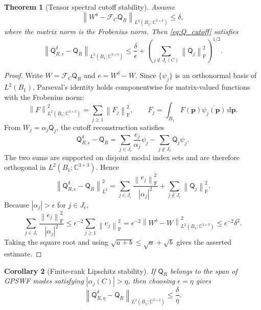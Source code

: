 \documentclass[11pt]{article}
\numberwithin{equation}{section}
\newcommand{\C}{\mathbb{C}}
\newcommand{\dd}{\,\mathrm d}
\newcommand{\vect}[1]{\bm{#1}}
\newcommand{\tens}[1]{\bm{\mathsf{#1}}}
\newcommand{\F}{\mathcal{F}}
\newcommand{\Qt}{\ensuremath{\tens{Q}}}
\newcommand{\abs}[1]{\left\lvert #1\right\rvert}
\newcommand{\norm}[1]{\left\lVert #1\right\rVert}
\newcommand{\Frob}{\mathrm F}
\theoremstyle{plain}
\newtheorem{theorem}{Theorem}[section]
\newtheorem{corollary}[theorem]{Corollary}
\theoremstyle{definition}
\begin{document}
\begin{theorem}[Tensor spectral cutoff stability]\label{thm:tensor_stability}
Assume
\begin{equation}\label{eq:data_noise_tensor}
  \norm{W^\delta-\F_C\Qt_R}_{L^2(B_1;\C^{3\times3})}\le\delta,
\end{equation}
where the matrix norm is the Frobenius norm.  Then \eqref{eq:Q_cutoff} satisfies
\begin{equation}\label{eq:tensor_cutoff_error}
  \norm{\Qt_{R,\epsilon}^\delta-\Qt_R}_{L^2(B_1;\C^{3\times3})}
  \le \frac{\delta}{\epsilon}
  +\left(\sum_{j\notin J_\epsilon(C)}\norm{\tens{Q}_j}_{\Frob}^2\right)^{1/2}.
\end{equation}
\end{theorem}

\begin{proof}
Write \(W=\F_C\Qt_R\) and \(e=W^\delta-W\).  Since \(\{\psi_j\}\) is an orthonormal basis of \(L^2(B_1)\), Parseval's identity holds componentwise for matrix-valued functions with the Frobenius norm:
\[
  \norm{F}_{L^2(B_1;\C^{3\times3})}^2
  =\sum_{j\ge1}\norm{F_j}_{\Frob}^2,
  \qquad
  F_j=\int_{B_1}F(\vect{p})\overline{\psi_j(\vect{p})}\dd\vect{p} .
\]
From \(W_j=\alpha_j\tens{Q}_j\), the cutoff reconstruction satisfies
\[
  \Qt_{R,\epsilon}^\delta-\Qt_R
  =\sum_{j\in J_\epsilon}\frac{e_j}{\alpha_j}\psi_j
  -\sum_{j\notin J_\epsilon}\tens{Q}_j\psi_j .
\]
The two sums are supported on disjoint modal index sets and are therefore orthogonal in \(L^2(B_1;\C^{3\times3})\).  Hence
\[
  \norm{\Qt_{R,\epsilon}^\delta-\Qt_R}_{L^2}^2
  =\sum_{j\in J_\epsilon}\frac{\norm{e_j}_{\Frob}^2}{\abs{\alpha_j}^2}
  +\sum_{j\notin J_\epsilon}\norm{\tens{Q}_j}_{\Frob}^2 .
\]
Because \(\abs{\alpha_j}>\epsilon\) for \(j\in J_\epsilon\),
\[
  \sum_{j\in J_\epsilon}\frac{\norm{e_j}_{\Frob}^2}{\abs{\alpha_j}^2}
  \le \epsilon^{-2}\sum_{j\ge1}\norm{e_j}_{\Frob}^2
  =\epsilon^{-2}\norm{W^\delta-W}_{L^2(B_1;\C^{3\times3})}^2
  \le \epsilon^{-2}\delta^2 .
\]
Taking the square root and using \(\sqrt{a+b}\le\sqrt a+\sqrt b\) gives the asserted estimate.
\end{proof}

\begin{corollary}[Finite-rank Lipschitz stability]\label{cor:finite_rank}
If $\Qt_R$ belongs to the span of GPSWF modes satisfying $\abs{\alpha_j(C)}>\eta$, then choosing $\epsilon=\eta$ gives
\begin{equation*}
  \norm{\Qt_{R,\eta}^\delta-\Qt_R}_{L^2(B_1;\C^{3\times3})}
  \le \frac{\delta}{\eta}.
\end{equation*}
\end{corollary}
\end{document}
